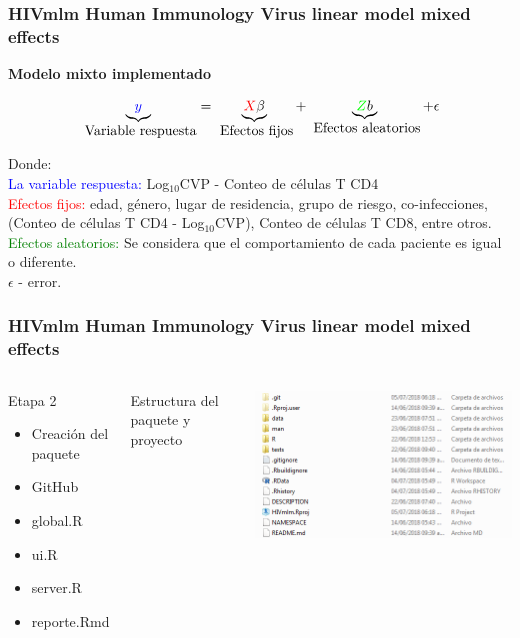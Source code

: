 \documentclass{beamer}%
\begin{document}
\begin{frame}
\frametitle{\textbf{HIVmlm Human Immunology Virus linear model mixed effects}}
\textbf{Modelo mixto implementado}

\begin{equation}
\notag \underbrace{\textcolor{blue}{y}}_{\mbox{ Variable respuesta}} = \underbrace{\textcolor{red}{X}\beta}_{\mbox{ Efectos fijos}} + \underbrace{\textcolor{green}{Z}b}_{\mbox{ Efectos aleatorios}}+ \epsilon
\end{equation}

\small{
Donde:\\
\textcolor{blue}{La variable respuesta:}  Log$_{10}$CVP - Conteo de c\'elulas T CD4\\
\textcolor{red}{Efectos fijos:}  edad, g\'enero, lugar de residencia, grupo de riesgo, co-infecciones, (Conteo de c\'elulas T CD4  -  Log$_{10}$CVP),  Conteo de c\'elulas T CD8, entre otros.\\
\textcolor{green}{Efectos aleatorios:}  Se considera que el comportamiento de cada paciente es igual o diferente.\\
$\epsilon$ - error.}
\end{frame}

\begin{frame}
\frametitle{\textbf{HIVmlm Human Immunology Virus linear model mixed effects}}
\begin{columns}[t]
 \begin{block}{Etapa 2}
  	\begin{itemize}
  	\item Creaci\'on del paquete
  	\item GitHub
  	\item global.R
  	\item ui.R
  	\item server.R
  	\item reporte.Rmd
  	\end{itemize}
  	\end{block}
    Estructura del paquete y proyecto
    \begin{center}\includegraphics[height=0.4\textheight]{estructura.PNG}\end{center}
  \end{columns}
\end{frame}
\end{document}
